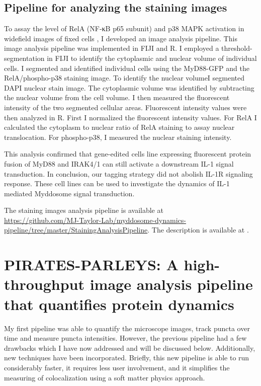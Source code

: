 \section{Pipeline for analyzing the staining images}
\label{section:staining_pipeline}
To assay the level of RelA (NF-κB p65 subunit) and p38 MAPK activation in widefield images of fixed cells , I developed an image analysis pipeline. This image analysis pipeline was implemented in FIJI and R. I employed a threshold-segmentation in FIJI to identify the cytoplasmic and nuclear volume of individual cells. I segmented and identified individual cells using the MyD88-GFP and the RelA/phospho-p38 staining image. To identify the nuclear volumeI segmented DAPI nuclear stain image. The cytoplasmic volume was identified by subtracting the nuclear volume from the cell volume. I then measured the fluorescent intensity of the two segmented cellular areas. Fluorescent intensity values were then analyzed in R. First I normalized the fluorescent intensity values. For RelA I calculated the cytoplasm to nuclear ratio of RelA staining to assay nuclear translocation. For phospho-p38, I measured the nuclear staining intensity.

This analysis confirmed that gene-edited cells line expressing fluorescent protein fusion of MyD88 and IRAK4/1 can still activate a downstream IL-1 signal transduction. In conclusion, our tagging strategy did not abolish IL-1R signaling response. These cell lines can be used to investigate the dynamics of IL-1 mediated Myddosome signal transduction.

The staining images analysis pipeline is available at \\ \url{https://github.com/MJ-Taylor-Lab/myddosome-dynamics-pipeline/tree/master/StainingAnalysisPipeline}. The description is available at \autocite{Deliz-Aguirre_2021}.

\chapter{PIRATES-PARLEYS: A high-throughput image analysis pipeline that quantifies protein dynamics}
\label{chapter:PIRATES_PARLEYS}
My first pipeline was able to quantify the microscope images, track puncta over time and measure puncta intensities. However, the previous pipeline had a few drawbacks which I have now addressed and will be discussed below. Additionally, new techniques have been incorporated. Briefly, this new pipeline is able to run considerably faster, it requires less user involvement, and it simplifies the measuring of colocalization using a soft matter physics approach.

